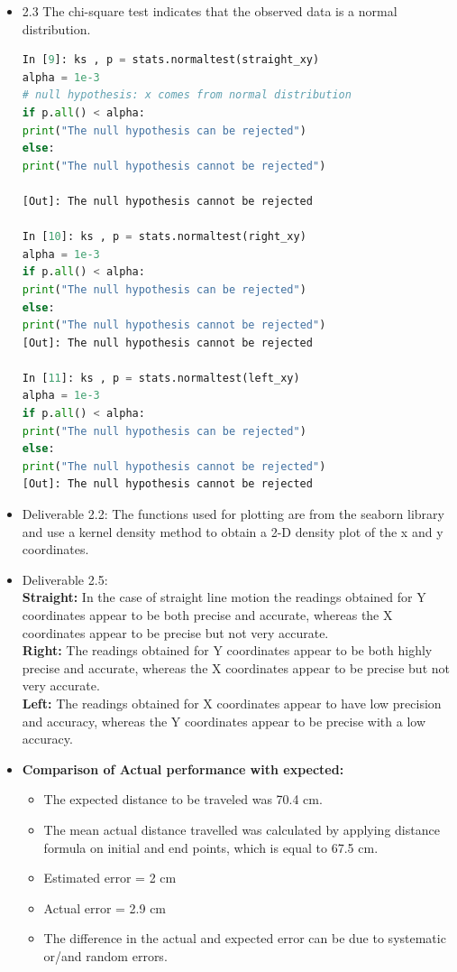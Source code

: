 \documentclass[11pt,a4paper]{article}
\begin{document}
			\begin{itemize}
				\item 2.3 The chi-square test indicates that the observed data is a normal distribution.
\begin{lstlisting}[language=Python]
In [9]: ks , p = stats.normaltest(straight_xy)
alpha = 1e-3
# null hypothesis: x comes from normal distribution
if p.all() < alpha: 
print("The null hypothesis can be rejected")
else:
print("The null hypothesis cannot be rejected")

[Out]: The null hypothesis cannot be rejected

In [10]: ks , p = stats.normaltest(right_xy)
alpha = 1e-3
if p.all() < alpha: 
print("The null hypothesis can be rejected")
else:
print("The null hypothesis cannot be rejected")
[Out]: The null hypothesis cannot be rejected

In [11]: ks , p = stats.normaltest(left_xy)
alpha = 1e-3
if p.all() < alpha: 
print("The null hypothesis can be rejected")
else:
print("The null hypothesis cannot be rejected")
[Out]: The null hypothesis cannot be rejected
\end{lstlisting}
				
				\item Deliverable 2.2: The functions used for plotting are from the seaborn library and use a kernel density method to obtain a 2-D density plot of the x and y coordinates. 
				\item Deliverable 2.5:\\
				
				\textbf{Straight:}  In the case of straight line motion the readings obtained for Y coordinates appear to be both precise and accurate, whereas the X coordinates appear to be precise but not very accurate. \\
				
				\textbf{Right:} The readings obtained for Y coordinates appear to be both highly precise and accurate, whereas the X coordinates appear to be precise but not very accurate. \\
				
				\textbf{Left:} The readings obtained for X coordinates appear to have low precision and accuracy, whereas the Y coordinates appear to be precise with a low accuracy.
				\item \textbf{Comparison of Actual performance with expected:} \begin{itemize} \item The expected distance to be traveled was 70.4 cm.
						\item The mean actual distance travelled was calculated by applying distance formula on initial and end points, which is equal to 67.5 cm.
						\item Estimated error = 2 cm
						\item Actual error = 2.9 cm
						\item The difference in the actual and expected error can be due to systematic or/and random errors.
					\end{itemize}
				\end{itemize} 
				\newpage
\end{document}
